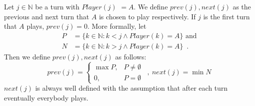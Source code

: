 \begin{definition}
  Let $j \in \mathbb{N}$ be a turn with $Player\left(j\right)$ $= A$. We define $prev\left(j\right), next\left(j\right)$
  as the previous and next turn that $A$ is chosen to play respectively. If $j$ is the first turn that $A$ plays,
  $prev\left(j\right) = 0$. More formally, let
  \begin{align*}
    P &= \{k \in \mathbb{N} : k < j \wedge Player\left(k\right) = A\} \mbox{ and} \\
    N &= \{k \in \mathbb{N} : k > j \wedge Player\left(k\right) = A\} \enspace.
  \end{align*}
  Then we define $prev\left(j\right), next\left(j\right)$ as follows:
  \begin{equation*}
    prev\left(j\right) = \begin{cases}
      \max{P}, & P \neq \emptyset \\
      0, & P = \emptyset
    \end{cases} \enspace, \:
    next\left(j\right) = \min{N}
  \end{equation*}
  $next\left(j\right)$ is always well defined with the assumption that after each turn eventually everybody plays.
\end{definition}

